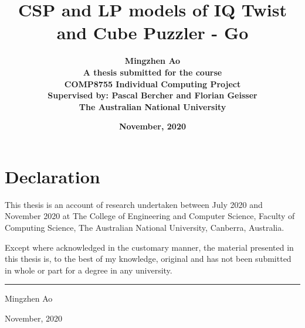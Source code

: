\documentclass[11pt,a4paper]{report}
\begin{document}

\begin{titlepage}
\title{\textbf{CSP and LP models of IQ Twist and Cube Puzzler - Go}\\[2cm]}
 \author{\textbf{Mingzhen Ao}\\[6cm]
 \textbf{A thesis submitted for the course}\\
 \textbf{COMP8755 Individual Computing Project} \\
 \textbf{Supervised by: Pascal Bercher and Florian Geisser}\\
 \textbf{The Australian National University}\\[1cm]}
 \date{\textbf{November, 2020}}
\maketitle
 \end{titlepage}
 
 \sloppy
 
\chapter*{Declaration}

This thesis is an account of research undertaken between July 2020 and 
November 2020 at The College of Engineering and Computer Science, Faculty of Computing Science, The Australian National University, Canberra, Australia.

Except where acknowledged in the customary manner, the material 
presented in this thesis is, to the best of my knowledge, original and 
has not been submitted in whole or part for a degree in any 
university.

\vspace{20mm}  %

\hspace{80mm}\rule{40mm}{.15mm}\par   %
\hspace{80mm} Mingzhen Ao\par
\hspace{80mm} November, 2020




\tableofcontents


\setcounter{page}{1}  %






\end{document}
